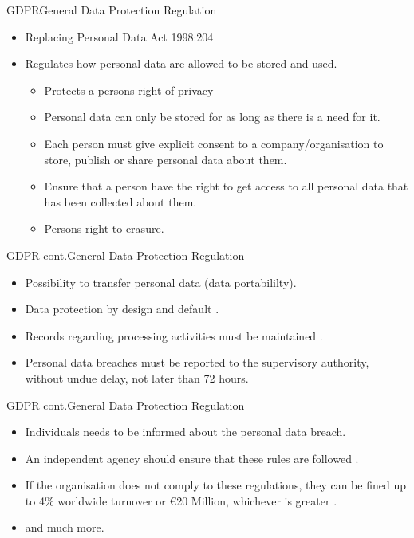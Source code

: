 \documentclass{beamer}
\begin{document}
\begin{frame}{GDPR}{General Data Protection Regulation}
  \begin{itemize}
    \item Replacing Personal Data Act 1998:204
    \item Regulates how personal data are allowed to be stored and used.
      \begin{itemize}
        \item Protects a persons right of privacy\cite[art. 5]{eu:gdpr}
        \item Personal data can only be stored for as long as there is a need
          for it\cite[art. 5]{eu:gdpr}.
        \item Each person must give explicit consent to a company/organisation
          to store, publish or share personal data about them\cite[art.
          7]{eu:gdpr}.  
        \item Ensure that a person have the right to get access
          to all personal
          data that has been collected about them\cite[art. 15]{eu:gdpr}.
        \item Persons right to erasure\cite[art. 17]{eu:gdpr}. 
      \end{itemize}
  \end{itemize}
\end{frame}
\begin{frame}{GDPR cont.}{General Data Protection Regulation}
    \begin{itemize}
      \item Possibility to transfer personal data (data
          portabililty)\cite[art. 20]{eu:gdpr}.  
      \item Data protection by design and default \cite[art. 25]{eu:gdpr}.
      \item Records regarding processing activities must be maintained \cite[art.
        30]{eu:gdpr}.
      \item Personal data breaches must be reported to the supervisory
        authority, without undue delay, not later than 72 hours\cite[art.
        33]{eu:gdpr}.
    \end{itemize}
\end{frame}
\begin{frame}{GDPR cont.}{General Data Protection Regulation}
\begin{itemize}
    \item Individuals needs to be informed about the personal data
        breach\cite[art. 34]{eu:gdpr}.
    \item An independent agency should ensure that these rules are followed
      \cite[art 51]{eu:gdpr}.
    \item If the organisation does not comply to these regulations, they can be
      fined up to 4\% worldwide turnover or €20 Million, whichever is greater
      \cite[art 83]{eu:gdpr}.
    \item and much more.
\end{itemize}
\end{frame}
\end{document}
